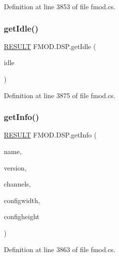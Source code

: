 Definition at line 3853 of file fmod.\+cs.

\mbox{\label{class_f_m_o_d_1_1_d_s_p_a3f643f98646f1f15c1fc3cf446aa7c25}} 
\subsubsection{\texorpdfstring{get\+Idle()}{getIdle()}}
{\footnotesize\ttfamily \hyperlink{namespace_f_m_o_d_a305d1176ef3f8c8815861a60407ac33d}{R\+E\+S\+U\+LT} F\+M\+O\+D.\+D\+S\+P.\+get\+Idle (\begin{DoxyParamCaption}\item[{out bool}]{idle }\end{DoxyParamCaption})}



Definition at line 3875 of file fmod.\+cs.

\mbox{\label{class_f_m_o_d_1_1_d_s_p_abe605a15d4638f3df5b9f2cdeccc5717}} 
\subsubsection{\texorpdfstring{get\+Info()}{getInfo()}}
{\footnotesize\ttfamily \hyperlink{namespace_f_m_o_d_a305d1176ef3f8c8815861a60407ac33d}{R\+E\+S\+U\+LT} F\+M\+O\+D.\+D\+S\+P.\+get\+Info (\begin{DoxyParamCaption}\item[{String\+Builder}]{name,  }\item[{out uint}]{version,  }\item[{out int}]{channels,  }\item[{out int}]{configwidth,  }\item[{out int}]{configheight }\end{DoxyParamCaption})}



Definition at line 3863 of file fmod.\+cs.

\mbox{\label{class_f_m_o_d_1_1_d_s_p_a9cdc8729a61c64aba4c951b4e175358f}} 
